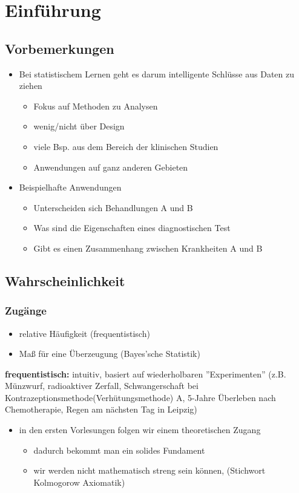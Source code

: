 \chapter{Einführung}
	\section{Vorbemerkungen}
	\begin{itemize}
		\item Bei statistischem Lernen geht es darum intelligente Schlüsse aus Daten zu ziehen
		\begin{itemize}
			\item Fokus auf Methoden zu Analysen
			\item wenig/nicht über Design
			\item viele Bsp. aus dem Bereich der klinischen Studien
			\item Anwendungen auf ganz anderen Gebieten
		\end{itemize}
	\item Beispielhafte Anwendungen
	\begin{itemize}
		\item Unterscheiden sich Behandlungen A und B
		\item Was sind die Eigenschaften eines diagnostischen Test
		\item Gibt es einen Zusammenhang zwischen Krankheiten A und B
	\end{itemize}
	\end{itemize}
\section{Wahrscheinlichkeit}
\subsection{Zugänge}
\begin{itemize}
	\item relative Häufigkeit (frequentistisch)
	\item Maß für eine Überzeugung (Bayes'sche Statistik)
\end{itemize}
\textbf{frequentistisch:} intuitiv, basiert auf wiederholbaren ''Experimenten'' (z.B. Münzwurf, radioaktiver Zerfall, Schwangerschaft bei Kontrazeptionsmethode(Verhütungsmethode) A, 5-Jahre Überleben nach Chemotherapie, Regen am nächsten Tag in Leipzig)

\begin{itemize}
	\item in den ersten Vorlesungen folgen wir einem theoretischen Zugang
	\begin{itemize}
		\item dadurch bekommt man ein solides Fundament
		\item wir werden nicht mathematisch streng sein können, (Stichwort Kolmogorow Axiomatik)
	\end{itemize}
\end{itemize}
